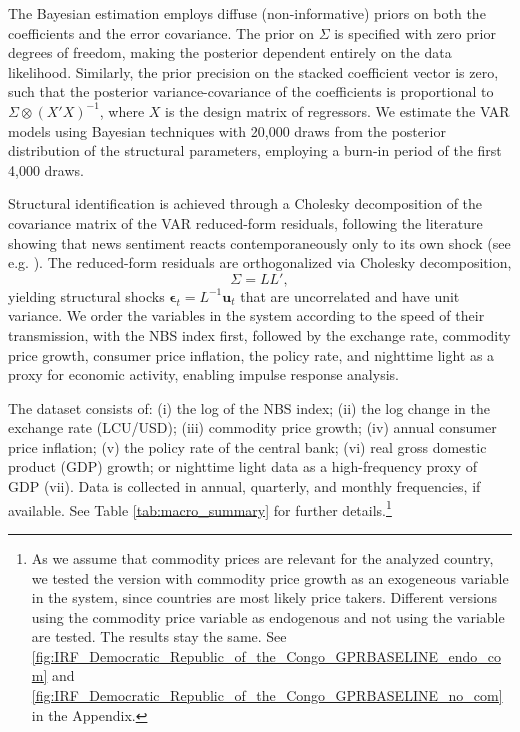 \documentclass[12pt,a4paper,fleqn]{article}
\begin{document}
The Bayesian estimation employs diffuse (non-informative) priors on both the coefficients and the error covariance. The prior on $\Sigma$ is specified with zero prior degrees of freedom, making the posterior dependent entirely on the data likelihood. Similarly, the prior precision on the stacked coefficient vector is zero, such that the posterior variance-covariance of the coefficients is proportional to $\Sigma \otimes (X'X)^{-1}$, where $X$ is the design matrix of regressors. We estimate the VAR models using Bayesian techniques with 20,000 draws from the posterior distribution of the structural parameters, employing a burn-in period of the first 4,000 draws.

Structural identification is achieved through a Cholesky decomposition of the covariance matrix of the VAR reduced-form residuals, following the literature showing that news sentiment reacts contemporaneously only to its own shock (see e.g. \cite{caldara2022, gambetti2023bad, LARSEN2019203}). The reduced-form residuals are orthogonalized via Cholesky decomposition,
\begin{equation}
\Sigma = LL',
\end{equation}
yielding structural shocks $\boldsymbol{\epsilon}_t = L^{-1}\mathbf{u}_t$ that are uncorrelated and have unit variance. We order the variables in the system according to the speed of their transmission, with the NBS index first, followed by the exchange rate, commodity price growth, consumer price inflation, the policy rate, and nighttime light as a proxy for economic activity, enabling impulse response analysis.


The dataset consists of: (i) the log of the NBS index; (ii) the log change in the exchange rate (LCU/USD); (iii) commodity price growth; (iv) annual consumer price inflation; (v) the policy rate of the central bank; (vi) real gross domestic product (GDP) growth; or nighttime light data as a high-frequency proxy of GDP (vii). Data is collected in annual, quarterly, and monthly frequencies, if available. See Table \ref{tab:macro_summary} for further details.\footnote{As we assume that commodity prices are relevant for the analyzed country, we tested the version with commodity price growth as an exogeneous variable in the system, since countries are most likely price takers. Different versions using the commodity price variable as endogenous and not using the variable are tested. The results stay the same. See \ref{fig:IRF_Democratic_Republic_of_the_Congo_GPRBASELINE_endo_com} and \ref{fig:IRF_Democratic_Republic_of_the_Congo_GPRBASELINE_no_com} in the Appendix.} %
\end{document}
